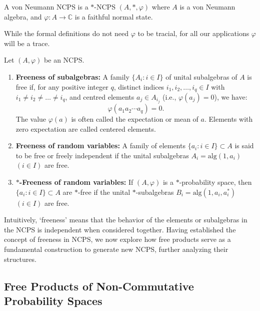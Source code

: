 \begin{definition}
A von Neumann NCPS is a $*$-NCPS $(A, *, \varphi)$ where $A$ is a von Neumann algebra, and $\varphi: A \rightarrow \mathbb{C}$ is a faithful normal state.
\end{definition}

While the formal definitions do not need $\varphi$ to be tracial, for all our applications $\varphi$ will be a trace.

\begin{definition}
Let $(A, \varphi)$ be an NCPS.
\begin{enumerate}
\item \textbf{Freeness of subalgebras:}  A family $\{A_i : i \in I\}$ of unital subalgebras of $A$ is free if, for any positive integer $q$, distinct indices $i_1, i_2, \ldots, i_q \in I$ with $i_1 \neq i_2 \neq \ldots \neq i_q$, and centred elements $a_j \in A_{i_j}$ (i.e., $\varphi(a_j) = 0$), we have:
\[
\varphi(a_1 a_2 \cdots a_q) = 0.
\]
The value $\varphi(a)$ is often called the expectation or mean of $a$. Elements with zero expectation are called centered elements.

    \item \textbf{Freeness of random variables:} 
    A family of elements $\{a_i: i\in I\} \subset A$ is said to be free or freely independent if the unital subalgebras $A_i = \text{alg}(1, a_i)$ $(i\in I)$ are free.
    

     
    \item \textbf{$*$-Freeness of random variables:} 
    If $(A, \varphi)$ is a $*$-probability space, then $\{a_i: i\in I\} \subset A$ are $*$-free if the unital $*$-subalgebras $B_i = \text{alg}(1, a_i, a_i^*)$ $(i\in I)$ are free.
\end{enumerate}
\end{definition}

Intuitively, `freeness' means that the behavior of the elements or subalgebras in the NCPS is independent when considered together. 
Having established the concept of freeness in NCPS, we now explore how free products serve as a fundamental construction to generate new NCPS, further analyzing their structures.

\subsection*{Free Products of Non-Commutative Probability Spaces}

